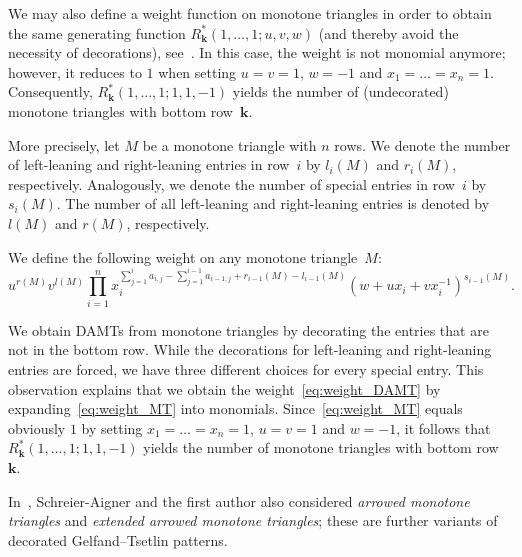 \documentclass[ALCO, Unicode]{cedram}
\newcommand{\deff}[1]{\emph{#1}}
\newcommand{\boldk}{\boldsymbol{k}}
\begin{document}
	We may also define a weight function on monotone triangles in order to obtain the same generating function $R_{\boldk}^{\ast}(1,\ldots,1;u,v,w)$ (and thereby avoid the necessity of decorations), see~\cite{FS23}. In this case, the weight is not monomial anymore; however, it reduces to $1$ when setting $u=v=1$, $w=-1$ and $x_1=\dots=x_n=1$. Consequently, $R_{\boldk}^{\ast}(1,\ldots,1;1,1,-1)$ yields the number of (undecorated) monotone triangles with bottom row~$\boldk$. 
	
	More precisely, let $M$ be a monotone triangle with $n$ rows. We denote the number of left-leaning and right-leaning entries in row~$i$ by $l_i(M)$ and $r_i(M)$, respectively. Analogously, we denote the number of special entries in row~$i$ by $s_i(M)$. The number of all left-leaning and right-leaning entries is denoted by $l(M)$ and $r(M)$, respectively.
	
	We define the following weight on any monotone triangle~$M$:
	\begin{equation}\label{eq:weight_MT}
		u^{r(M)}  v^{l(M)}
		\prod_{i=1}^n x_i^{\sum_{j=1}^{i} a_{i,j}-\sum_{j=1}^{i-1} a_{i-1,j} + r_{i-1}(M) - l_{i-1}(M)} \left( w+ u x_i + v x_i^{-1} \right)^{s_{i-1}(M)}.
	\end{equation}
	
	We obtain DAMTs from monotone triangles by decorating the entries that are not in the bottom row. While the decorations for left-leaning and right-leaning entries are forced, we have three different choices for every special entry. This observation explains that we obtain the weight~\eqref{eq:weight_DAMT} by expanding~\eqref{eq:weight_MT} into monomials. Since~\eqref{eq:weight_MT} equals obviously $1$ by setting $x_1=\dots=x_n=1$, $u=v=1$ and $w=-1$, it follows that $R_{\boldk}^{\ast}(1,\ldots,1;1,1,-1)$ yields the number of monotone triangles with bottom row~$\boldk$.
	
	In~\cite{FS23}, Schreier-Aigner and the first author also considered \deff{arrowed monotone triangles} and \deff{extended arrowed monotone triangles}; these are further variants of decorated Gelfand--Tsetlin patterns.
	
\end{document}
